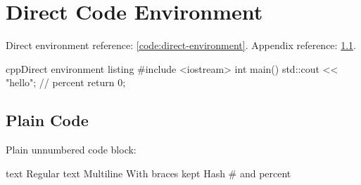 \documentclass[a4paper,12pt]{report}
\begin{document}
\chapter{Direct Code Environment}
Direct environment reference: \ref{code:direct-environment}.
Appendix reference: \ref{app:plain-code}.

\begin{code}{cpp}{Direct environment listing}
#include <iostream>
int main()
{
    std::cout << "hello";
    // percent %
    return 0;
}
\end{code}

\appendixChapter
\section{Plain Code}\label{app:plain-code}
Plain unnumbered code block:

\begin{codeWithoutLabel}{text}
Regular text
Multiline
With braces { kept }
Hash # and percent %
\end{codeWithoutLabel}
\end{document}
